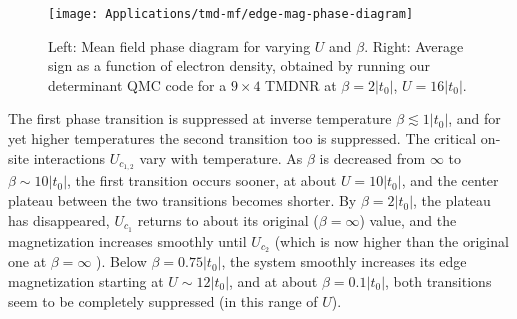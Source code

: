 \vspace{-0.6cm}
\begin{figure}[H]
\hspace{0.3cm}
\texttt{[image: Applications/tmd-mf/edge-mag-phase-diagram]}
	\caption[Mean field phase diagram for varying $U$ and $\beta$. Average sign as a function of electron density, obtained by running our determinant \ac{QMC} code for a $9 \times 4$ \acs{TMDNR} at $\beta = 2| t_0 |$, $U = 16| t_0 |$.]{Left: Mean field phase diagram for varying $U$ and $\beta$. Right: Average sign as a function of electron density, obtained by running our determinant \ac{QMC} code for a $9 \times 4$ \acs{TMDNR} at $\beta = 2| t_0 |$, $U = 16| t_0 |$.}
	\label{fig:pdMF}
\end{figure}
\vspace{-0.3cm}
The first phase transition is suppressed at inverse temperature $\beta \lesssim 1 | t_0 |$, and for yet higher temperatures the second transition too is suppressed.
The critical on-site interactions $U_{c_{1, 2}}$ vary with temperature.
As $\beta$ is decreased from $\infty$ to $\beta \sim 10 | t_0 |$, the first transition occurs sooner, at about $U = 10 | t_0 |$, and the center plateau between the two transitions becomes shorter.
By $\beta = 2 | t_0 |$, the plateau has disappeared, $U_{c_1}$ returns to about its original ($\beta = \infty$) value, and the magnetization increases smoothly until $U_{c_2}$ (which is now higher than the original one at $\beta = \infty$ ).
Below $\beta = 0.75 | t_0 |$, the system smoothly increases its edge magnetization starting at $U \sim 12 | t_0 |$, and at about $\beta = 0.1 | t_0 |$, both transitions seem to be completely suppressed (in this range of $U$).

